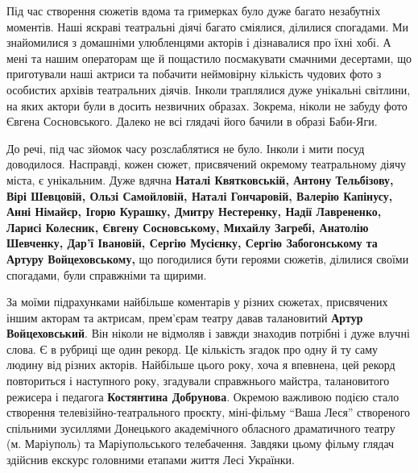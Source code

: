 
Під час створення сюжетів вдома та гримерках було дуже багато незабутніх
моментів. Наші яскраві театральні діячі багато сміялися, ділилися спогадами. Ми
знайомилися з домашніми улюбленцями акторів  і дізнавалися  про їхні хобі. А
мені та нашим операторам ще й пощастило посмакувати смачними десертами, що
приготували наші актриси та  побачити неймовірну кількість чудових фото з
особистих архівів  театральних діячів. Інколи траплялися дуже унікальні
світлини, на яких актори були в досить незвичних образах. Зокрема, ніколи не
забуду фото Євгена Сосновського. Далеко не всі глядачі його бачили в образі
Баби-Яги.


До речі, під час зйомок часу розслаблятися не було. Інколи і мити посуд
доводилося. Насправді, кожен сюжет, присвячений окремому театральному діячу
міста, є унікальним. Дуже вдячна \textbf{Наталі Квятковській, Антону Тельбізову, Вірі
Шевцовій, Ользі Самойловій, Наталі Гончаровій, Валерію Капінусу, Анні Німайєр,
Ігорю Курашку, Дмитру Нестеренку, Надії Лаврененко, Ларисі Колесник, Євгену
Сосновському,  Михайлу Загребі, Анатолію Шевченку, Дар'ї Івановій, Сергію
Мусієнку, Сергію Забогонському та Артуру Войцеховському,} що погодилися бути
героями сюжетів, ділилися своїми спогадами, були справжніми та щирими.


За моїми підрахунками найбільше коментарів у різних сюжетах, присвячених іншим
акторам та актрисам, прем'єрам театру давав талановитий \textbf{Артур
Войцеховський}.  Він ніколи не відмоляв і завжди знаходив потрібні і дуже
влучні слова. Є в рубриці ще один рекорд. Це кількість згадок про одну й ту
саму людину від різних акторів. Найбільше цього року, хоча я впевнена, цей
рекорд повториться і наступного року, згадували справжнього майстра,
талановитого режисера і педагога \textbf{Костянтина Добрунова}. Окремою
важливою  подією стало створення телевізійно-театрального проєкту, міні-фільму
\enquote{Ваша Леся} створеного спільними зусиллями Донецького академічного
обласного драматичного театру (м. Маріуполь) та Маріупольського телебачення.
Завдяки цьому фільму глядач здійснив екскурс головними етапами життя Лесі
Українки.


